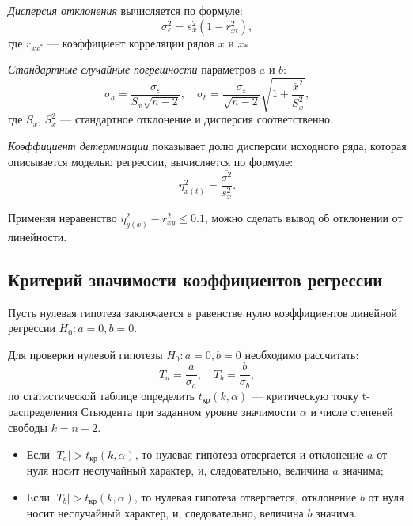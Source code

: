 \textit{Дисперсия отклонения} вычисляется по формуле:
\begin{equation*}
	\sigma_{\varepsilon}^2 = s_x^2(1 - r_{xt}^2),
\end{equation*}
где $r_{xx^{*}}$ --- коэффициент корреляции рядов $x$ и $x_{*}$

\textit{Стандартные случайные погрешности} параметров $a$ и $b$:
\begin{equation*}
	\sigma_a = \frac{\sigma_{\varepsilon }}{S_x \sqrt{n - 2}}, \quad \sigma_b = \frac{\sigma_{\varepsilon}}{\sqrt{n-2}} \sqrt{1 + \frac{\overline{x}^2}{S_x^2}},
\end{equation*}
где $S_x$, $S_x^2$ --- стандартное отклонение и дисперсия соответственно.

\textit{Коэффициент детерминации} показывает долю дисперсии исходного ряда, которая описывается моделью регрессии, вычисляется по формуле:
\begin{equation*}
	\eta_{x(t)}^2 = \frac{\overline{\sigma^2}}{s_x^2}.
\end{equation*}

Применяя неравенство $\eta_{y(x)}^2 - r_{xy}^2 \le 0.1$, можно сделать вывод об отклонении от линейности.

\subsection*{Критерий значимости коэффициентов регрессии} %
\label{subsec:sign_regr}

Пусть нулевая гипотеза заключается в равенстве нулю коэффициентов линейной регрессии $H_0: a=0, b=0$.

Для проверки нулевой гипотезы $H_0: a=0, b=0$ необходимо рассчитать:
\begin{equation*}
	T_a = \frac{a}{\sigma_a}, \quad T_b = \frac{b}{\sigma_b},
\end{equation*}
по статистической таблице определить $t_{\textrm{кр}} \left( k, \alpha \right)$ --- критическую точку t-распределения Стьюдента при заданном уровне значимости $\alpha$ и числе степеней свободы $k = n - 2$.
\begin{itemize}
	\item Если $\left| T_a \right| > t_{\textrm{кр}} \left( k, \alpha \right)$, то нулевая гипотеза	отвергается и отклонение $a$ от нуля носит неслучайный характер, и, следовательно, величина $a$ значима;
	\item Если $\vert T_b \vert > t_{\textrm{кр}} \left( k, \alpha \right)$, то нулевая гипотеза отвергается, отклонение $b$ от нуля носит неслучайный характер, и, следовательно, величина $b$ значима.
\end{itemize}

